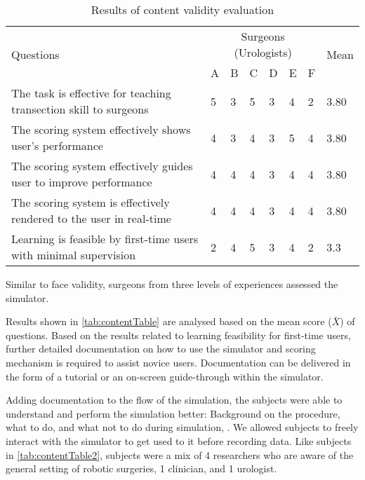 \begin{table}
\small
\centering
\begin{tabular}{p{6cm}p{0.5cm}p{0.5cm}p{0.5cm}p{0.5cm}p{0.5cm}p{0.5cm}p{0.8cm}}
  \multirow{2}{4em}{Questions} & \multicolumn{6}{c}{Surgeons (Urologists)} & \multirow{2}{4em}{Mean}\\
  \cmidrule{2-7}
  & A & B & C & D & E & F &\\
  \toprule
  The task is effective for teaching transection skill to surgeons
  & 5& 3& 5& 3 & 4& 2 & 3.80\\
  \midrule
   The scoring system effectively shows user's performance
  & 4& 3& 4 & 3 & 5 & 4 & 3.80\\
  \midrule
   The scoring system effectively guides user to improve performance
  & 4 & 4 & 4& 3& 4 & 4 & 3.80\\
  \midrule
  The scoring system is effectively rendered to the user in real-time
  & 4 & 4 & 4& 3& 4 & 4 & 3.80\\
  \midrule
  Learning is feasible by first-time users with minimal supervision & 2 & 4 & 5 & 3 & 4& 2 & 3.3\\
  \bottomrule
\end{tabular}
\caption{Results of content validity evaluation}
\label{tab:contentTable}
\end{table}

Similar to face validity, surgeons from three levels of experiences assessed the simulator.

Results shown in \autoref{tab:contentTable} are analysed based on the mean score ($\bar{X}$) of questions. Based on the results related to learning feasibility for first-time users, further detailed documentation on how to use the simulator and scoring mechanism is required to assist novice users. Documentation can be delivered in the form of a tutorial or an on-screen guide-through within the simulator.

Adding documentation to the flow of the simulation, the subjects were able to understand and perform the simulation better: Background on the  procedure, what to do, and what not to do during simulation, \etc. We allowed subjects to freely interact with the simulator to get used to it before recording data. Like subjects in \autoref{tab:contentTable2}, subjects were a mix of 4 researchers who are aware of the general setting of robotic surgeries, 1 clinician, and 1 urologist.

